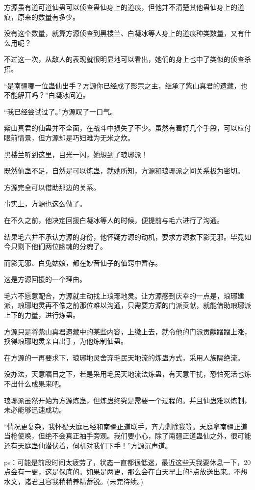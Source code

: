 \begin{this_body}
方源虽有道可道仙蛊可以侦查蛊仙身上的道痕，但他并不清楚其他蛊仙身上的道痕，原来的数量有多少。

没有这个数量，就算方源侦查到黑楼兰、白凝冰等人身上的道痕种类数量，又有什么用呢？

不过这一次，从敌人的表现就很明显地可以看出，她们的身上也中了类似的侦查杀招。

“是南疆哪一位蛊仙出手？方源你已经成了影宗之主，继承了紫山真君的遗藏，也不能解开吗？”白凝冰问道。

“我已经尝试过了。”方源叹了一口气。

紫山真君的仙蛊并不全面，在战斗中损失了不少。虽然有着好几个手段，可以应付眼前情景，但方源却是巧妇难为无米之炊。

黑楼兰听到这里，目光一闪，她想到了琅琊派！

既然仙蛊不足，自然是可以炼蛊，就她所知，方源和琅琊派之间关系极为密切。

方源完全可以借助那边的关系。

事实上，方源也这么做了。

在不久之前，他决定回援白凝冰等人的时候，便提前与毛六进行了沟通。

结果毛六并不承认方源的身份，他怀疑方源的动机，要求方源救下影无邪。毕竟如今只剩下他们两位幽魂的分魂了。

而影无邪、白兔姑娘，都在妙音仙子的仙窍中暂存。

这是方源回援的一个理由。

毛六不愿意配合，方源就主动找上琅琊地灵。让方源感到庆幸的一点是，琅琊建派，琅琊地灵再不像之前那位难以沟通，只需要方源的门派贡献，就能借助琅琊派上下的力量，进行炼蛊。

方源只是将紫山真君遗藏中的某些内容，上缴上去，就令他的门派贡献蹭蹭上涨，换得琅琊地灵亲自出手，为他炼制仙蛊。

在方源的一再要求下，琅琊地灵舍弃毛民天地流的炼蛊方式，采用人族隔绝流。

没办法，天意瞩目之下，若是采用毛民天地流法炼蛊，有天意干扰，恐怕死活也炼不出什么成果来吧。

琅琊派虽然开始为方源炼蛊，但炼蛊终究是需要一个过程的。并且仙蛊难以炼制，未必能够迅速成功。

“情况更复杂，我怀疑天庭已经和南疆正道联手，齐力剿除我等。天庭拿南疆正道当枪使唤，但绝不会真正袖手旁观。我们要小心，除了南疆正道蛊仙之外，很可能还有天庭蛊仙潜伏着，伺机对我们下手！”方源沉声道。

ps：可能是前段时间太疲劳了，状态一直都很低迷，最近这些天我要休息一下，20点会有一更，这是保底的。如果是两更，那么会在白天早上的8点放送出来。不想水文，诸君且容我稍稍养精蓄锐。(未完待续。)

\end{this_body}

